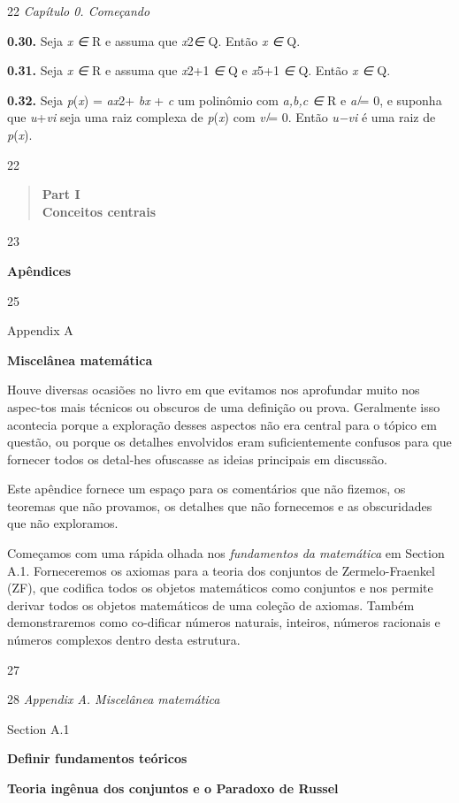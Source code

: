 \documentclass[
]{article}
\begin{document}
22 \emph{Capítulo 0. Começando}

\textbf{0.30.} Seja \emph{x ∈} R e assuma que \emph{x}2\emph{∈} Q. Então
\emph{x ∈} Q.

\textbf{0.31.} Seja \emph{x ∈} R e assuma que \emph{x}2+1 \emph{∈} Q e
\emph{x}5+1 \emph{∈} Q. Então \emph{x ∈} Q.

\textbf{0.32.} Seja \emph{p}(\emph{x}) = \emph{ax}2+ \emph{bx} +
\emph{c} um polinômio com \emph{a,b,c ∈} R e \emph{a ̸}= 0, e suponha
que \emph{u}+\emph{vi} seja uma raiz complexa de \emph{p}(\emph{x}) com
\emph{v ̸}= 0. Então \emph{u−vi} é uma raiz de \emph{p}(\emph{x}).

22

\begin{quote}
\textbf{Part I}\\
\textbf{Conceitos centrais}
\end{quote}

23

\textbf{Apêndices}

25

Appendix A

\textbf{Miscelânea matemática}

Houve diversas ocasiões no livro em que evitamos nos aprofundar muito
nos aspec-tos mais técnicos ou obscuros de uma definição ou prova.
Geralmente isso acontecia porque a exploração desses aspectos não era
central para o tópico em questão, ou porque os detalhes envolvidos eram
suficientemente confusos para que fornecer todos os detal-hes ofuscasse
as ideias principais em discussão.

Este apêndice fornece um espaço para os comentários que não fizemos, os
teoremas que não provamos, os detalhes que não fornecemos e as
obscuridades que não exploramos.

Começamos com uma rápida olhada nos \emph{fundamentos da matemática} em
Section A.1. Forneceremos os axiomas para a teoria dos conjuntos de
Zermelo-Fraenkel (ZF), que codifica todos os objetos matemáticos como
conjuntos e nos permite derivar todos os objetos matemáticos de uma
coleção de axiomas. Também demonstraremos como co-dificar números
naturais, inteiros, números racionais e números complexos dentro desta
estrutura.

27

28 \emph{Appendix A. Miscelânea matemática}

Section A.1

\textbf{Definir fundamentos teóricos}

\textbf{Teoria ingênua dos conjuntos e o Paradoxo de Russel}
\end{document}
